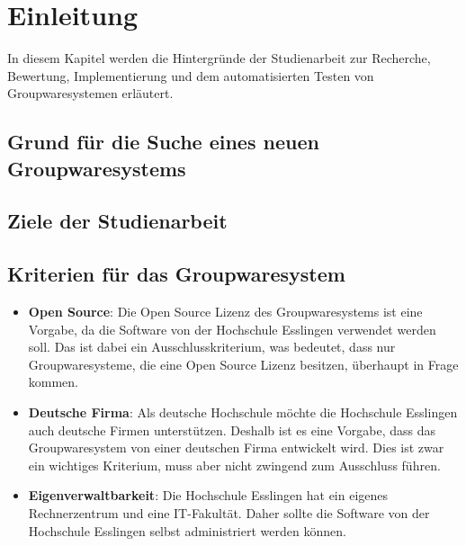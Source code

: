 \chapter{Einleitung}

In diesem Kapitel werden die Hintergründe der Studienarbeit zur Recherche, Bewertung, Implementierung und dem automatisierten Testen von Groupwaresystemen erläutert.

\section{Grund für die Suche eines neuen Groupwaresystems}

\section{Ziele der Studienarbeit}

\section{Kriterien für das Groupwaresystem}%
\begin{itemize}
    \item \textbf{Open Source}: 
    Die Open Source Lizenz des Groupwaresystems ist eine Vorgabe, da die Software von der Hochschule Esslingen verwendet werden soll.
    Das ist dabei ein Ausschlusskriterium, was bedeutet, dass nur Groupwaresysteme, die eine Open Source Lizenz besitzen, überhaupt in Frage kommen.
    \item \textbf{Deutsche Firma}:
    Als deutsche Hochschule möchte die Hochschule Esslingen auch deutsche Firmen unterstützen.
    Deshalb ist es eine Vorgabe, dass das Groupwaresystem von einer deutschen Firma entwickelt wird.
    Dies ist zwar ein wichtiges Kriterium, muss aber nicht zwingend zum Ausschluss führen.
    \item \textbf{Eigenverwaltbarkeit}:
    Die Hochschule Esslingen hat ein eigenes Rechnerzentrum und eine IT-Fakultät.
    Daher sollte die Software von der Hochschule Esslingen selbst administriert werden können.
\end{itemize}
